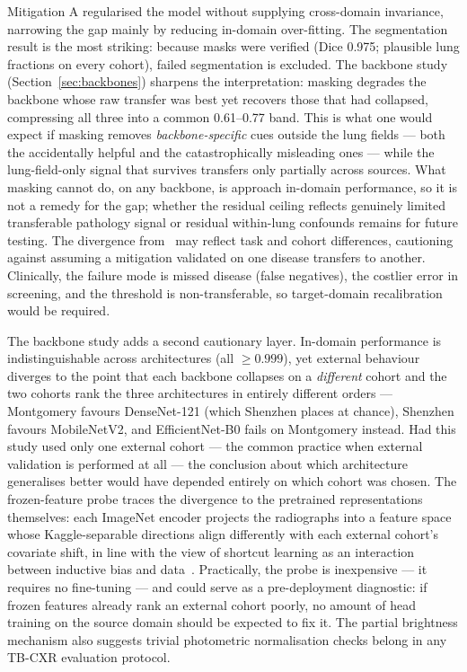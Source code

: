 \documentclass[journal]{IEEEtran}
\begin{document}
Mitigation A regularised the model without supplying cross-domain invariance,
narrowing the gap mainly by reducing in-domain over-fitting. The segmentation
result is the most striking: because masks were verified (Dice 0.975; plausible
lung fractions on every cohort), failed segmentation is excluded. The backbone
study (Section~\ref{sec:backbones}) sharpens the interpretation: masking
degrades the backbone whose raw transfer was best yet recovers those that had
collapsed, compressing all three into a common 0.61--0.77 band. This is what
one would expect if masking removes \emph{backbone-specific} cues outside the
lung fields --- both the accidentally helpful and the catastrophically
misleading ones --- while the lung-field-only signal that survives transfers
only partially across sources. What masking cannot do, on any backbone, is
approach in-domain performance, so it is not a remedy for the gap; whether the
residual ceiling reflects genuinely limited transferable pathology signal or
residual within-lung confounds remains for future testing. The divergence
from~\cite{bassi2022covid} may reflect task and cohort differences, cautioning
against assuming a mitigation validated on one disease transfers to another.
Clinically, the failure mode is missed disease (false negatives), the costlier
error in screening, and the threshold is non-transferable, so target-domain
recalibration would be required.

The backbone study adds a second cautionary layer. In-domain performance is
indistinguishable across architectures (all $\geq 0.999$), yet external
behaviour diverges to the point that each backbone collapses on a
\emph{different} cohort and the two cohorts rank the three architectures in
entirely different orders --- Montgomery favours DenseNet-121 (which Shenzhen
places at chance), Shenzhen favours MobileNetV2, and EfficientNet-B0 fails on
Montgomery instead. Had this study used only one external cohort --- the common
practice when external validation is performed at all --- the conclusion about
which architecture generalises better would have depended entirely on which
cohort was chosen. The frozen-feature probe traces the divergence to the
pretrained representations themselves: each ImageNet encoder projects the
radiographs into a feature space whose Kaggle-separable directions align
differently with each external cohort's covariate shift, in line with the view
of shortcut learning as an interaction between inductive bias and
data~\cite{geirhos2020shortcut}. Practically, the probe is inexpensive --- it
requires no fine-tuning --- and could serve as a pre-deployment diagnostic: if
frozen features already rank an external cohort poorly, no amount of head
training on the source domain should be expected to fix it. The partial
brightness mechanism also suggests trivial photometric normalisation checks
belong in any TB-CXR evaluation protocol.
\end{document}
